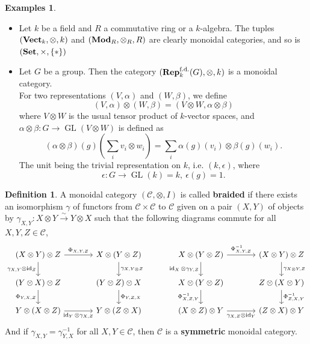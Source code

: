 \documentclass{article}
\theoremstyle{plain}
\theoremstyle{definition}
\newtheorem{definition}[theorem]{Definition}
\newtheorem{examples}[theorem]{Examples}
\DeclareMathOperator{\GL}{GL}
\DeclareMathOperator{\id}{id}
\DeclareMathOperator{\SET}{\bf{Set}}
\DeclareMathOperator{\Vect}{\bf{Vect}}
\DeclareMathOperator{\Rep}{\bf{Rep}}
\DeclareMathOperator{\Mod}{\bf{Mod}}
\begin{document}
\begin{examples}\textbf{ }
\begin{itemize}
    \item[$a)$] Let $k$ be a field and $R$ a commutative ring or a $k$-algebra. The tuples $(\Vect_k, \otimes, k)$ and $(\Mod_R, \otimes_R,R)$ are clearly monoidal categories, and so is $(\SET, \times, \{*\})$
    
    \item[$b)$] Let $G$ be a group. Then the category $(\Rep^{\text{f.d.}}_k(G), \otimes, k)$ is a monoidal category.\\
    For two representations $(V,\alpha)$ and $(W,\beta)$, we define
    $$(V,\alpha) \otimes (W,\beta) = (V\otimes W, \alpha\otimes \beta)$$
    where $V\otimes W$ is the usual tensor product of $k$-vector spaces, and $\alpha\otimes\beta:G\rightarrow \GL(V\otimes W)$ is defined as 
    $$(\alpha\otimes\beta)(g)(\sum_i v_i\otimes w_i) = \sum_i \alpha(g)(v_i)\otimes \beta(g)(w_i).$$
    The unit being the trivial representation on $k$, i.e. $(k,\epsilon)$, where
    $$\epsilon:G\rightarrow \GL(k) = k, \: \epsilon(g)= 1.$$
\end{itemize}
\end{examples}


\begin{definition}
    A monoidal category $(\mathcal{C}, \otimes, I)$ is called \textbf{braided} if there exists an isomorphism $\gamma$ of functors from $\mathcal{C}\times \mathcal{C}$ to $\mathcal{C}$ given on a pair $(X,Y)$ of objects by 
    $\gamma_{X,Y} : X\otimes Y\xrightarrow{\sim} Y\otimes X$
    such that the following diagrams commute for all $X,Y,Z\in \mathcal{C}$,
    \[
    \begin{tikzcd}[column sep = large]
        (X\otimes Y)\otimes Z  
        \arrow[r,"\Phi_{X,Y,Z}"] 
        \arrow[d, "\gamma_{X,Y}\otimes\id_Z"'] & X\otimes (Y\otimes Z)
    \arrow[d,"\gamma_{X,Y\otimes Z}"]\\
        (Y\otimes X)\otimes Z
        \arrow[d,"\Phi_{Y,X,Z}"']&
        (Y\otimes Z)\otimes X
        \arrow[d,"\Phi_{Y,Z,X}"]\\
        Y\otimes (X\otimes Z) 
        \arrow[r, "\id_Y\otimes\gamma_{X,Z}"'] &
        Y\otimes(Z\otimes X)
    \end{tikzcd}
    \hspace{1cm}
    \begin{tikzcd}[column sep = large]
        X\otimes (Y\otimes Z) 
        \arrow[r, "\Phi_{X,Y,Z}^{-1}"] \arrow[d,"\id_X\otimes \gamma_{Y,Z}"']  & 
        (X\otimes Y)\otimes Z
        \arrow[d,"\gamma_{X\otimes Y, Z}"]\\
        X\otimes (Y\otimes Z) \arrow[d,"\Phi_{X,Z,Y}^{-1}"']  
        &  Z\otimes (X\otimes Y)
        \arrow[d,"\Phi_{Z,X,Y}^{-1}"]\\
        (X\otimes Z)\otimes Y
        \arrow[r,"\gamma_{X,Z}\otimes \id_Y"']&
        (Z\otimes X)\otimes Y
    \end{tikzcd}
    \]
    And if $\gamma_{X,Y} = \gamma^{-1}_{Y,X}$ for all $X,Y\in \mathcal{C}$, then $\mathcal{C}$ is a \textbf{symmetric} monoidal category.
\end{definition}
\end{document}
